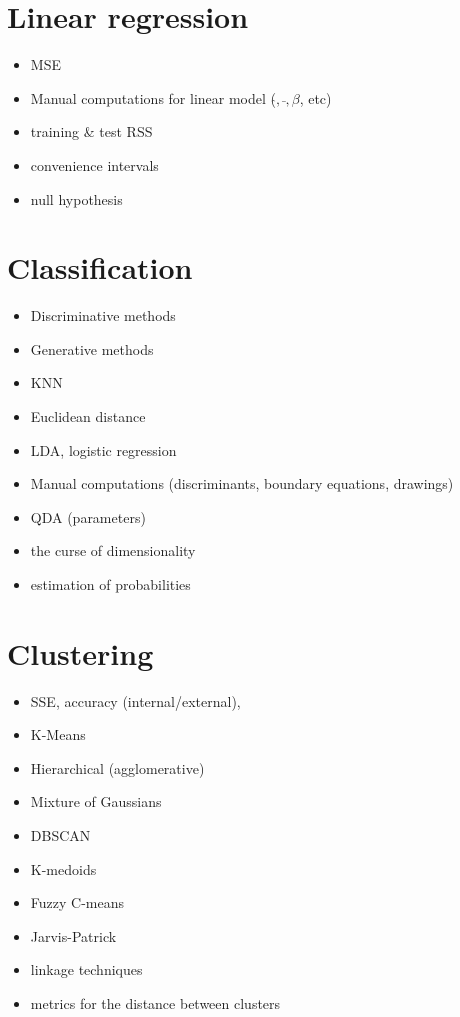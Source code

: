 \documentclass[a4paper,12pt,titlepage]{article} %
\begin{document}
\section{Linear regression }
\begin{itemize}
	\item MSE
	\item Manual computations for linear model ($ \hat{}, \bar{}, \beta$, etc)
	\item training \& test RSS
	\item convenience intervals
	\item null hypothesis
\end{itemize}

\section{Classification}
\begin{itemize}
	\item Discriminative methods
	\item Generative methods
	\item KNN
	\item Euclidean distance
	\item LDA, logistic regression
	\item Manual computations (discriminants, boundary equations, drawings)
	\item QDA (parameters)
	\item the curse of dimensionality
	\item estimation of probabilities
\end{itemize}

\section{Clustering}
\begin{itemize}
	\item SSE, accuracy (internal/external),
	\item K-Means
	\item Hierarchical (agglomerative)
	\item Mixture of Gaussians
	\item DBSCAN
	\item K-medoids
	\item Fuzzy C-means
	\item Jarvis-Patrick
	\item linkage techniques
	\item metrics for the distance between clusters
\end{itemize}

\end{document}
